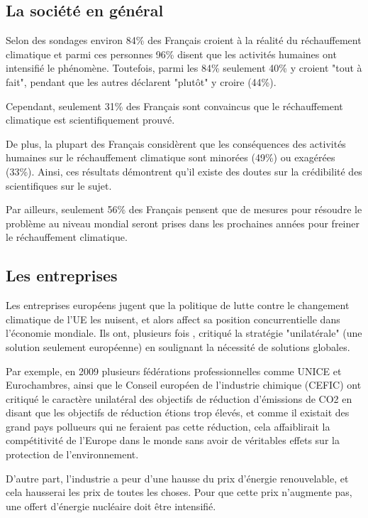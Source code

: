\documentclass[a4paper,11pt]{article}
\begin{document}
\subsection[La société en général]
{La société en général} 

Selon des sondages environ 84\% des Français croient à la réalité du réchauffement
climatique et  parmi ces  personnes  96\% disent que  les activités
humaines ont intensifié le phénomène.
Toutefois, parmi les 84\% seulement 40\% y croient "tout à fait", pendant que les autres déclarent "plutôt" y
croire (44\%). ~\cite{FR}

Cependant, seulement 31\% des Français sont convaincus que le réchauffement climatique est
scientifiquement prouvé.

De plus, la plupart des Français considèrent que les conséquences des activités humaines
sur le réchauffement climatique sont minorées (49\%) ou exagérées (33\%). 
Ainsi, ces résultats démontrent qu'il existe des doutes sur la crédibilité des scientifiques sur le
sujet. 

Par ailleurs, seulement 56\% des Français pensent que de mesures pour résoudre le
problème au niveau mondial seront prises dans  les prochaines années  pour freiner le réchauffement  climatique.

\subsection{Les entreprises}

Les entreprises européens jugent que la politique  de  lutte  contre  le
changement climatique de l'UE les nuisent, et alors affect sa position concurrentielle dans l'économie
mondiale. Ils  ont, plusieurs  fois , critiqué  la stratégie  "unilatérale" (une
solution seulement européenne) en
soulignant la nécessité de solutions globales.

Par  exemple, en  2009  plusieurs fédérations  professionnelles  comme UNICE  et
Eurochambres, ainsi que le Conseil  européen de l'industrie chimique (CEFIC) ont
critiqué le caractère  unilatéral des objectifs de réduction  d'émissions de CO2
en  disant que  les  objectifs de  réduction  étions trop  élevés,  et comme  il
existait des grand  pays pollueurs qui ne feraient pas  cette réduction, cela
affaiblirait la compétitivité de l'Europe dans le monde sans avoir de véritables effets sur la
protection de l'environnement.

D'autre part, l'industrie a peur d'une hausse du prix d'énergie renouvelable, et
cela hausserai  les prix de  toutes les choses.  Pour que cette  prix n'augmente
pas, une offert d'énergie nucléaire doit être intensifié.
\end{document}
